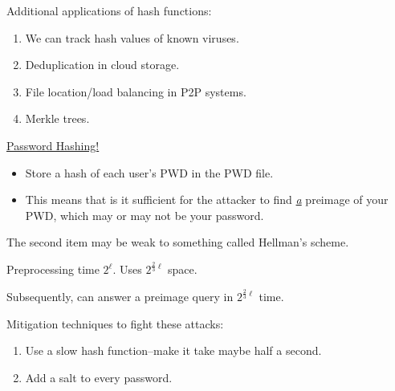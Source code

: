\documentclass[12pt]{article}
\begin{document}
Additional applications of hash functions:\begin{enumerate}

\item We can track hash values of known viruses.

\item Deduplication in cloud storage.

\item File location/load balancing in P2P systems.

\item Merkle trees.

\end{enumerate}

\underline{Password Hashing!}\begin{itemize}

\item Store a hash of each user's PWD in the PWD file.

\item This means that is it sufficient for the attacker to find \underline{\it a} preimage of your PWD, which may or may not be your password.

\end{itemize}

The second item may be weak to something called Hellman's scheme.

Preprocessing time $2^{\ell}$. Uses $2^{\frac{2}{3}\ell}$ space.

Subsequently, can answer a preimage query in $2^{\frac{2}{3}\ell}$ time.

Mitigation techniques to fight these attacks:\begin{enumerate}

\item Use a slow hash function--make it take maybe half a second.

\item Add a salt to every password.

\end{enumerate}
\end{document}
